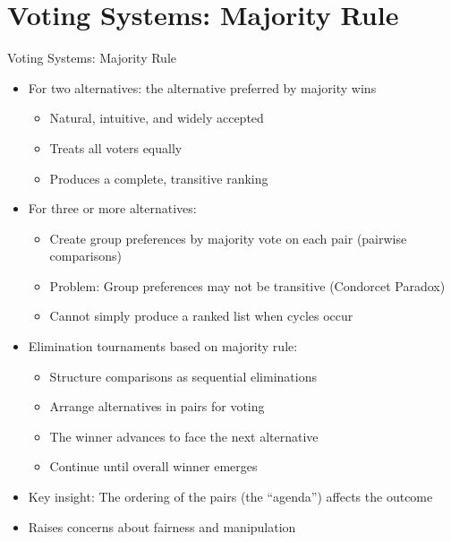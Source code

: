 \documentclass[10pt]{beamer}
\begin{document}
\section{Voting Systems: Majority Rule}

\begin{frame}{Voting Systems: Majority Rule}
  \begin{itemize}[<+->]
    \item For two alternatives: the alternative preferred by majority wins
      \begin{itemize}
        \item Natural, intuitive, and widely accepted
        \item Treats all voters equally
        \item Produces a complete, transitive ranking
      \end{itemize}
    \item For three or more alternatives:
      \begin{itemize}
        \item Create group preferences by majority vote on each pair (pairwise comparisons)
        \item Problem: Group preferences may not be transitive (Condorcet Paradox)
        \item Cannot simply produce a ranked list when cycles occur
      \end{itemize}
    \item Elimination tournaments based on majority rule:
      \begin{itemize}
        \item Structure comparisons as sequential eliminations
        \item Arrange alternatives in pairs for voting
        \item The winner advances to face the next alternative
        \item Continue until overall winner emerges
      \end{itemize}
    \item Key insight: The ordering of the pairs (the ``agenda'') affects the outcome
    \item Raises concerns about fairness and manipulation
  \end{itemize}
\end{frame}
\end{document}
